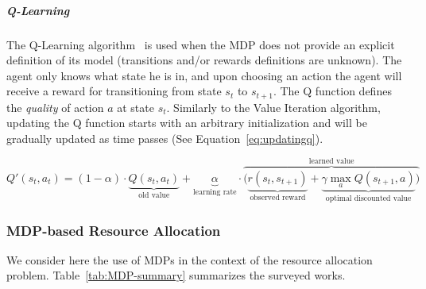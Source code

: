 \subparagraph{Q-Learning}
The Q-Learning algorithm~\cite{qlearning} is used when the MDP does not provide an explicit definition of its model (\ie transitions and/or rewards definitions are unknown).
The agent only knows what state he is in, and upon choosing an action the agent will receive a reward for transitioning from state $s_t$ to $s_{t+1}$.
The Q function defines the \textit{quality} of action $a$ at state $s_t$.
Similarly to the Value Iteration algorithm, updating the Q function starts with an arbitrary initialization and will be gradually updated as time passes (See Equation~\eqref{eq:updatingq}).

\begin{equation}\label{eq:updatingq}
Q'(s_{t},a_{t}) = (1-\alpha) \cdot \underbrace{Q(s_{t},a_{t})}_{\text{old value}} + \underbrace{\alpha}_{\text{learning rate}} \cdot  \overbrace{\bigg( \underbrace{r(s_t,s_{t+1})}_{\text{observed reward}} + \underbrace{\gamma \max_{a}Q(s_{t+1}, a)}_{\text{optimal discounted value}} \bigg) }^{\text{learned value}}
\end{equation}



\subsubsection{MDP-based Resource Allocation}
We consider here the use of MDPs in the context of the resource allocation problem.
Table~\ref{tab:MDP-summary} summarizes the surveyed works.


